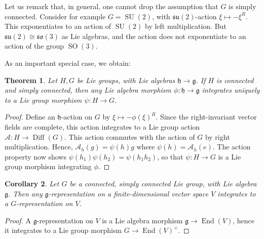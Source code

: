 \documentclass{article}
\newtheorem{theorem}{Theorem}[section]
\newtheorem{corollary}[theorem]{Corollary}
\theoremstyle{remark}
\newcommand\A{\mathcal{A}}
\newcommand\lie[1]{\mathfrak{#1}}
\newcommand{\h}{\lie{h}}
\newcommand{\g}{\lie{g}}
\newcommand{\on}{\operatorname}
\newcommand{\End}{ \on{End} }
\newcommand{\SU}{ \on{SU}}
\newcommand{\SO}{ \on{SO}}
\newcommand{\mf}{\mathfrak}
\begin{document}
Let us remark that, in general, one cannot drop the assumption that $G$ is simply connected. Consider for example 
$G=\SU(2)$, with $\mf{su}(2)$-action $\xi\mapsto-\xi^R$. This exponentiates  to an action of $\SU(2)$ by left multiplication. But $\mf{su}(2)\cong \mf{so}(3)$ as Lie algebras, and the action does not exponentiate to 
an action of the group $\SO(3)$.
 
As an important special case, we obtain: 
%
\begin{theorem}
Let $H,G$ be Lie groups, with Lie algebras $\h\to \g$. If $H$ is connected and simply connected, then any Lie algebra 
morphism $\phi\colon \h\to \g$ integrates uniquely to a Lie group morphism $\psi\colon H\to G$.
\end{theorem}
\begin{proof}
Define an $\h$-action on $G$ by $\xi\mapsto -\phi(\xi)^R$. Since the right-invariant vector fields are complete, this action integrates to a Lie group action $\A\colon H\to \on{Diff}(G)$. 
This action commutes with the action of $G$ by right multiplication. Hence, $\A_h(g)=\psi(h)g$ where 
$\psi(h)=\A_h(e)$. The action property now shows $\psi(h_1)\psi(h_2)=\psi(h_1h_2)$, so that 
$\psi\colon H\to G$ is a Lie group morphism integrating $\phi$. 
\end{proof}
%
\begin{corollary}
Let $G$ be a connected, simply connected Lie group, with Lie algebra $\g$. Then any 
$\g$-representation on a finite-dimensional vector space $V$ 
integrates to a $G$-representation on $V$. 
\end{corollary}
\begin{proof}
A $\g$-representation on $V$ is a Lie algebra morphism $\g\to \End(V)$, hence it integrates to a 
Lie group morphism $G\to \End(V)^\times$. 
\end{proof}
\end{document}
